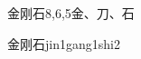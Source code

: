 \begin{entry}{金刚石}{8,6,5}{⾦、⼑、⽯}
  \begin{phonetics}{金刚石}{jin1gang1shi2}
  \end{phonetics}
\end{entry}
